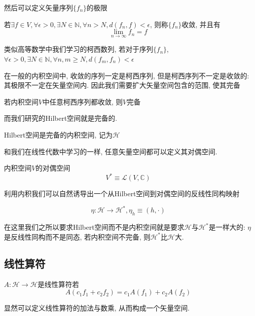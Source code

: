 然后可以定义矢量序列$\{f_n\}$的极限
\begin{definition}[矢量序列极限]
    若$\exists f\in V, \forall \epsilon>0, \exists N\in\mathbb{N}, \forall n>N, d(f_n, f)<\epsilon$, 则称$\{f_n\}$收敛, 并且有
    \begin{equation}
        \lim_{n\to\infty}f_n=f
    \end{equation}
\end{definition}

\begin{definition}[柯西序列]
    类似高等数学中我们学习的柯西数列, 若对于序列$\{f_n\}$, $\forall \epsilon>0, \exists N\in\mathbb N, \forall n, m\ge N, d(f_m, f_n)<\epsilon$
\end{definition}
在一般的内积空间中, 收敛的序列一定是柯西序列, 但是柯西序列不一定是收敛的: 其极限不一定在矢量空间内. 因此我们需要扩大矢量空间包含的范围, 使其完备
\begin{definition}[完备性]
    若内积空间$V$中任意柯西序列都收敛, 则$V$完备
\end{definition}

而我们研究的Hilbert空间就是完备的.
\begin{definition}[Hilbert空间]
    Hilbert空间是完备的内积空间, 记为$\mathscr H$
\end{definition}

和我们在线性代数中学习的一样, 任意矢量空间都可以定义其对偶空间.
\begin{definition}[对偶空间]
    内积空间$V$的对偶空间
    \begin{equation}
        V^*\equiv\mathcal L(V, \mathbb C)
    \end{equation}
\end{definition}

利用内积我们可以自然诱导出一个从Hilbert空间到对偶空间的反线性同构映射
\begin{definition}
    \begin{equation}
        \eta: \mathscr H\to\mathscr H^*, \eta_h\equiv(h, \cdot)
    \end{equation}
\end{definition}
在这里我们之所以要求Hilbert空间而不是内积空间就是要求$\mathscr H$与$\mathscr H^*$是一样大的: $\eta$是反线性同构而不是同态, 若内积空间不完备, 则$\mathscr H^*$比$\mathscr H$大.

\subsection{线性算符}
\begin{definition}[线性算符]\label{linear-operator}
    $A: \mathscr H\to\mathscr H$是线性算符若
    \begin{equation}
        A(c_1f_1+c_2f_2)=c_1A(f_1)+c_2A(f_2)\label{linear-operator-eq1}
    \end{equation}
\end{definition}
显然可以定义线性算符的加法与数乘, 从而构成一个矢量空间.

